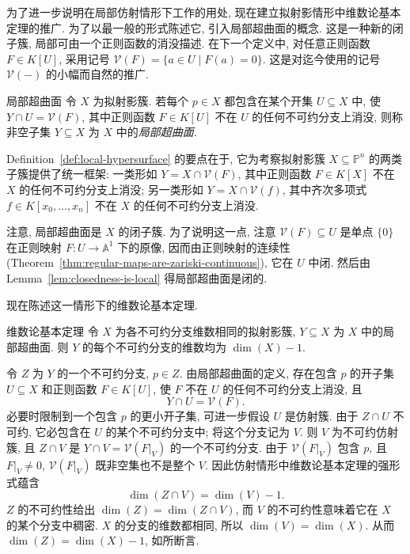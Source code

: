 为了进一步说明在局部仿射情形下工作的用处, 现在建立拟射影情形中维数论基本定理的推广. 为了以最一般的形式陈述它, 引入局部超曲面的概念. 这是一种新的闭子簇, 局部可由一个正则函数的消没描述. 在下一个定义中, 对任意正则函数 $F\in K[U]$, 采用记号 $\mathcal{V}(F)=\{a\in U\mid F(a)=0\}$. 这是对迄今使用的记号 $\mathcal{V}(-)$ 的小幅而自然的推广.

\begin{Definition}{局部超曲面}\leavevmode\label{def:local-hypersurface}
令 $X$ 为拟射影簇. 若每个 $p\in X$ 都包含在某个开集 $U\subseteq X$ 中, 使 $Y\cap U=\mathcal{V}(F)$, 其中正则函数 $F\in K[U]$ 不在 $U$ 的任何不可约分支上消没, 则称非空子集 $Y\subseteq X$ 为 $X$ 中的\emph{局部超曲面}.
\end{Definition}

Definition~\ref{def:local-hypersurface} 的要点在于, 它为考察拟射影簇 $X\subseteq\mathbb{P}^{n}$ 的两类子簇提供了统一框架: 一类形如 $Y=X\cap\mathcal{V}(F)$, 其中正则函数 $F\in K[X]$ 不在 $X$ 的任何不可约分支上消没; 另一类形如 $Y=X\cap\mathcal{V}(f)$, 其中齐次多项式 $f\in K[x_{0},\ldots,x_{n}]$ 不在 $X$ 的任何不可约分支上消没.

注意, 局部超曲面是 $X$ 的闭子簇. 为了说明这一点, 注意 $\mathcal{V}(F)\subseteq U$ 是单点 $\{0\}$ 在正则映射 $F:U\to\mathbb{A}^{1}$ 下的原像, 因而由正则映射的连续性 (Theorem~\ref{thm:regular-maps-are-zariski-continuous}), 它在 $U$ 中闭. 然后由 Lemma~\ref{lem:closedness-is-local} 得局部超曲面是闭的.

现在陈述这一情形下的维数论基本定理.

\begin{Theorem}{维数论基本定理}\leavevmode\label{thm:fundamental-dimension-theorem-for-quasiprojective-varieties}
令 $X$ 为各不可约分支维数相同的拟射影簇, $Y\subseteq X$ 为 $X$ 中的局部超曲面. 则 $Y$ 的每个不可约分支的维数均为 $\dim(X)-1$.
\end{Theorem}
\begin{Proof}
令 $Z$ 为 $Y$ 的一个不可约分支, $p\in Z$. 由局部超曲面的定义, 存在包含 $p$ 的开子集 $U\subseteq X$ 和正则函数 $F\in K[U]$, 使 $F$ 不在 $U$ 的任何不可约分支上消没, 且
\[
  Y\cap U=\mathcal{V}(F).
\]
必要时限制到一个包含 $p$ 的更小开子集, 可进一步假设 $U$ 是仿射簇. 由于 $Z\cap U$ 不可约, 它必包含在 $U$ 的某个不可约分支中; 将这个分支记为 $V$. 则 $V$ 为不可约仿射簇, 且 $Z\cap V$ 是 $Y\cap V=\mathcal{V}(F|_{V})$ 的一个不可约分支. 由于 $\mathcal{V}(F|_{V})$ 包含 $p$, 且 $F|_{V}\ne0$, $\mathcal{V}(F|_{V})$ 既非空集也不是整个 $V$. 因此仿射情形中维数论基本定理的强形式蕴含
\[
  \dim(Z\cap V)=\dim(V)-1.
\]
$Z$ 的不可约性给出 $\dim(Z)=\dim(Z\cap V)$, 而 $V$ 的不可约性意味着它在 $X$ 的某个分支中稠密. $X$ 的分支的维数都相同, 所以 $\dim(V)=\dim(X)$. 从而 $\dim(Z)=\dim(X)-1$, 如所断言.
\end{Proof}

